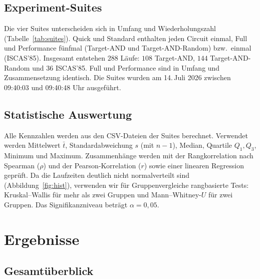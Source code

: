 \documentclass[a4paper,12pt]{article}
\theoremstyle{definition}
\newcommand{\resultsdir}{../src/results}
\begin{document}
\subsection{Experiment-Suites}

Die vier Suites unterscheiden sich in Umfang und Wiederholungszahl (Tabelle~\ref{tab:suites}). Quick und Standard enthalten jeden Circuit einmal, Full und Performance fünfmal (Target-AND und Target-AND-Random) bzw.\ einmal (ISCAS'85). Insgesamt entstehen $288$ Läufe: $108$ Target-AND, $144$ Target-AND-Random und $36$ ISCAS'85. Full und Performance sind in Umfang und Zusammensetzung identisch. Die Suites wurden am 14.\,Juli 2026 zwischen 09:40:03 und 09:40:48 Uhr ausgeführt.

\begin{table}[ht]
\centering\small
\setlength{\tabcolsep}{4pt}

\caption{Die vier Experiment-Suites. T-AND: Target-AND, T-AND-R: Target-AND-Random. $\bar{t}$: Mittelwert, $s$: Standardabweichung, $\tilde{t}$: Median der Laufzeit. Die Dauer ist aus den Zeitstempeln (Auflösung 1\,s) als obere Schranke abgeleitet.}
\label{tab:suites}
\end{table}

\subsection{Statistische Auswertung}

Alle Kennzahlen werden aus den CSV-Dateien der Suites berechnet. Verwendet werden Mittelwert $\bar{t}$, Standardabweichung $s$ (mit $n-1$), Median, Quartile $Q_1, Q_3$, Minimum und Maximum. Zusammenhänge werden mit der Rangkorrelation nach Spearman ($\rho$) und der Pearson-Korrelation ($r$) sowie einer linearen Regression geprüft. Da die Laufzeiten deutlich nicht normalverteilt sind (Abbildung~\ref{fig:hist}), verwenden wir für Gruppenvergleiche rangbasierte Tests: Kruskal--Wallis für mehr als zwei Gruppen und Mann--Whitney-$U$ für zwei Gruppen. Das Signifikanzniveau beträgt $\alpha = 0{,}05$.

\section{Ergebnisse}
\label{sec:ergebnisse}

\subsection{Gesamtüberblick}
\end{document}
